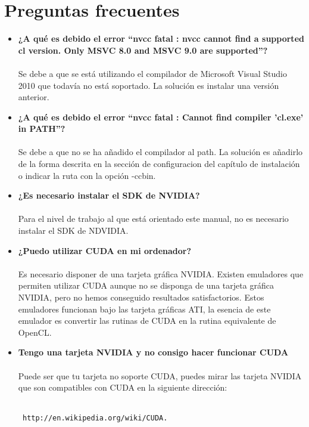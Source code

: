 \section{Preguntas frecuentes}
\begin{itemize}
 \item  \textbf{¿A qué es debido el error ``nvcc fatal   : nvcc cannot find a
  supported cl version. Only MSVC 8.0 and MSVC 9.0 are supported''?}\\\\
  Se debe a que se está utilizando el compilador de Microsoft Visual Studio 2010
  que todavía no está soportado. La solución es instalar una versión anterior.
 \item \textbf{¿A qué es debido el error ``nvcc fatal   : Cannot find compiler 'cl.exe' in PATH''?}\\\\
  Se debe a que no se ha añadido el compilador al path. La solución es añadirlo de la forma
  descrita en la sección de configuracion del capítulo de instalación o indicar la ruta con
  la opción -ccbin.
  \item \textbf{¿Es necesario instalar el SDK de NVIDIA?}\\\\
    Para el nivel de trabajo al que está orientado este manual, no es necesario instalar el SDK de NDVIDIA.
  \item \textbf{¿Puedo utilizar CUDA en mi ordenador?}\\\\
  Es necesario disponer de una tarjeta gráfica NVIDIA. Existen emuladores que permiten utilizar CUDA aunque no se disponga de una tarjeta gráfica NVIDIA, pero no hemos conseguido resultados satisfactorios. Estos emuladores funcionan bajo las tarjeta gráficas ATI, la esencia de este emulador es convertir las rutinas de CUDA en la rutina equivalente de OpenCL.
 \item \textbf{Tengo una tarjeta NVIDIA y no consigo hacer funcionar CUDA}\\\\
Puede ser que tu tarjeta no soporte CUDA, puedes mirar las tarjeta NVIDIA que son compatibles con CUDA en la siguiente dirección: \\\\ \begin{verbatim} http://en.wikipedia.org/wiki/CUDA. \end{verbatim}
\end{itemize}
